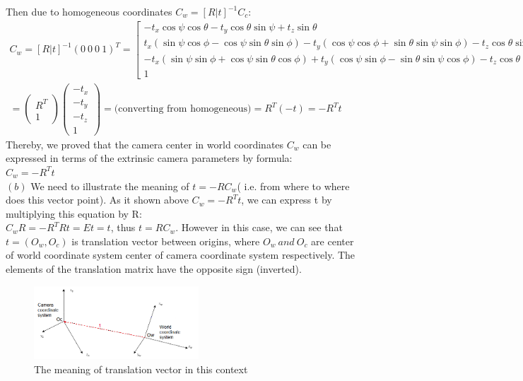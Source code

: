 \documentclass[a4paper, twoside, english]{article}
\begin{document}
\normalsize
Then due to homogeneous coordinates $ C_w = [R| t]^{-1}C_c$:\\
\begin{equation*}
\begin{gathered}	
C_w = [R| t]^{-1}(0 \ 0\ 0\ 1)^T=
\left[
\begin{array}{cccc}
	 -t_x\cos\psi\cos\theta - t_y\cos\theta\sin\psi + t_z\sin\theta \\
	t_x(\sin\psi\cos\phi-\cos\psi\sin\theta\sin\phi) -t_y(\cos\psi\cos\phi+\sin\theta\sin\psi\sin\phi) -t_z\cos\theta\sin\phi\\
	-t_x(\sin\psi\sin\phi+\cos\psi\sin\theta\cos\phi)+t_y(\cos\psi\sin\phi-\sin\theta\sin\psi\cos\phi) - t_z\cos\theta\cos\phi\\
	1
\end{array}
\right] =\\ =
\left(
\begin{array}{cc}
	R^T\\
	1
\end{array} 
\right)
\left(
 \begin{array}{cccc}
	-t_x\\
	-t_y\\
	-t_z\\
	1
\end{array} 
\right)= \text{(converting from homogeneous)} = R^T(-t)=-R^Tt
\end{gathered}
\end{equation*}
Thereby, we proved that the camera center in world coordinates $C_w$ can be expressed in terms of the extrinsic camera parameters by formula:\\
$C_w = -R^Tt$\\
$(b) $ We need to illustrate the meaning of $t = -RC_w $( i.e. from where to where does this vector point).
As it shown above $C_w = -R^Tt$, we can express t by multiplying this equation by R:\\
$C_wR = -R^TRt=Et=t$, thus $t = RC_w $.
However in this case, we can see that $t = (O_w,O_c)$ is translation vector between origins, where $O_w \ and \ O_c$ are center of world coordinate system center of camera coordinate system respectively. The elements of the translation matrix have the opposite sign (inverted).
\begin{figure}[h!]
	\centerline{\includegraphics[width=0.55\textwidth]{trans.png}}
	\caption[trans]{ The meaning of translation vector in this context}
	\label{fig:trans}
\end{figure}
\end{document}
